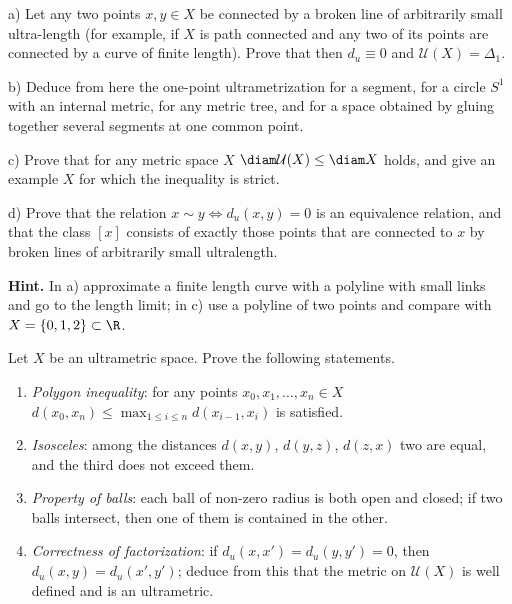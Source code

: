 \documentclass[a4paper,12pt]{report}
\begin{document}
\begin{task}
\textup{a)} Let any two points $x,y\in X$ be connected by a broken line of arbitrarily small ultra-length \textup{(}for example, if $X$ is path connected and any two of its points are connected by a curve of finite length\textup{)}. Prove that then $d_u\equiv 0$ and $\mathcal U(X)=\Delta_1$.

\textup{b)} Deduce from here the one-point ultrametrization for a segment, for a circle $S^1$ with an internal metric, for any metric tree, and for a space obtained by gluing together several segments at one common point.

\textup{c)} Prove that for any metric space $X$ $\diam\mathcal U(X)\le\diam X$ holds, and give an example $X$ for which the inequality is strict.

\textup{d)} Prove that the relation $x\sim y\iff d_u(x,y)=0$ is an equivalence relation, and that the class $[x]$ consists of exactly those points that are connected to $x$ by broken lines of arbitrarily small ultralength.

\textbf{Hint.} In \textup{a)} approximate a finite length curve with a polyline with small links and go to the length limit\textup{;} in \textup{c)} use a polyline of two points and compare with $X=\{0,1,2\}\subset\R$.
\end{task}

\begin{task}
Let $X$ be an ultrametric space. Prove the following statements.
\begin{enumerate}[label=\textup{(\alph*)}]
\item \emph{Polygon inequality}\textup{:} for any points $x_0,x_1,\dots,x_n\in X$ $d(x_0,x_n)\le\max_{1\le i\le n}d(x_{i-1},x_i)$ is satisfied.
\item \emph{Isosceles}\textup{:} among the distances $d(x,y)$, $d(y,z)$, $d(z,x)$ two are equal, and the third does not exceed them.
\item \emph{Property of balls}\textup{:} each ball of non-zero radius is both open and closed\textup{;} if two balls intersect, then one of them is contained in the other.
\item \emph{Correctness of factorization}\textup{:} if $d_u(x,x')=d_u(y,y')=0$, then $d_u(x,y)=d_u(x',y')$\textup{;} deduce from this that the metric on $\mathcal U(X)$ is well defined and is an ultrametric.
\end{enumerate}
\end{task}
\end{document}
